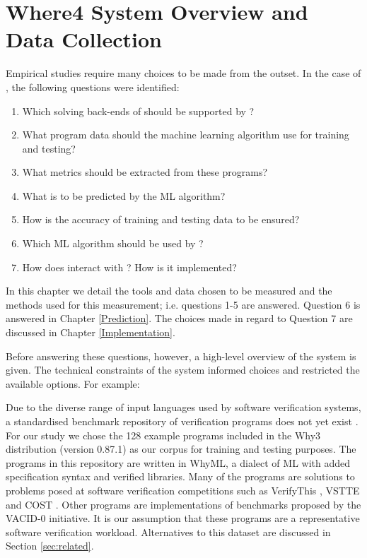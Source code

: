 \chapter{Where4 System Overview and Data Collection}%
\thispagestyle{nohead}
\label{Experimental} %

Empirical studies require many choices to be made from the outset. In the case of \where, the following questions were identified:

\begin{enumerate}
	\item Which solving back-ends of \why should be supported by \where?
	\item What program data should the machine learning algorithm use for training and testing?
	\item What metrics should be extracted from these programs?
	\item What is to be predicted by the ML algorithm?
	\item How is the accuracy of training and testing data to be ensured?
	\item Which ML algorithm should be used by \where?
	\item How does \where interact with \why? How is it implemented?   
\end{enumerate}   

In this chapter we detail the tools and data chosen to be measured and the methods used for this measurement; i.e. questions 1-5 are answered. Question 6 is answered in Chapter \ref{Prediction}. The choices made in regard to Question 7 are discussed in Chapter \ref{Implementation}. 

Before answering these questions, however, a high-level overview of the \where system is given. The technical constraints of the system informed choices and restricted the available options. For example:  

Due to the diverse range of input languages used by software verification systems, a standardised benchmark repository of verification programs does not yet exist \cite{Dagstuhl}.
For our study we chose the 128 example programs included in the \textsf{Why3} distribution (version 0.87.1) as our corpus for training and testing purposes. The programs in this repository are written in WhyML, a dialect of ML with added specification syntax and verified libraries. Many of the programs are solutions to problems posed at software verification competitions such as VerifyThis \cite{verifythis}, VSTTE \cite{Klebanov2011} and COST \cite{bormer:hal-00789525}. Other programs are implementations of benchmarks proposed by the VACID-0 \cite{Leino10vacid-0:verification} initiative.   It is our assumption that these programs are a representative software verification workload. Alternatives to this dataset are discussed in Section \ref{sec:related}. 

